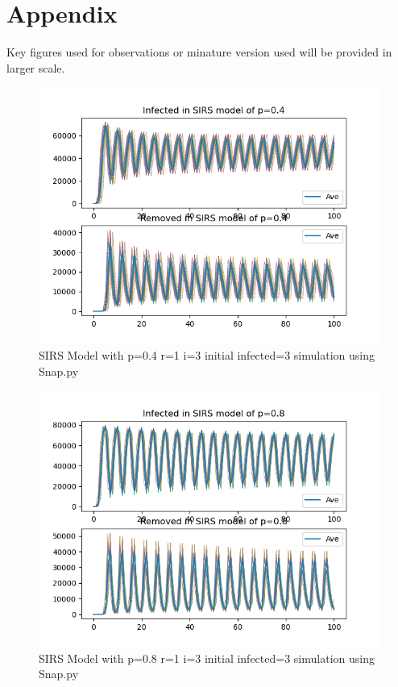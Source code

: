 \documentclass{subfile}
\begin{document}
  \section{Appendix}
  Key figures used for observations or minature version used will be provided in larger scale.
  \begin{figure}[!h]
  \includegraphics[scale=0.8]{sirsp04r1i3s3}
  \caption[SIRS p=0.4,r=1,i=3,init infected=3]{SIRS Model with p=0.4 r=1 i=3 initial infected=3 simulation using Snap.py}
  \end{figure}
  \begin{figure}
  \includegraphics[scale=0.8]{sirsp08r1i3s3}
  \caption[SIRS p=0.8,r=1,i=3,init infected=3]{SIRS Model with p=0.8 r=1 i=3 initial infected=3 simulation using Snap.py}
  \end{figure}
\end{document}
